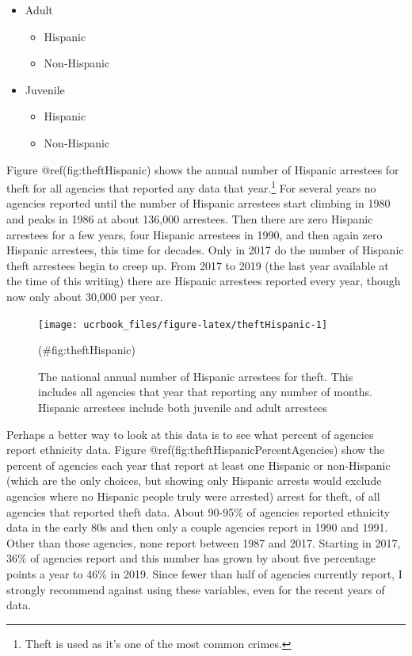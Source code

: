 \documentclass[
  12pt,
  openany]{book}
\providecommand{\tightlist}{%
  \setlength{\itemsep}{0pt}\setlength{\parskip}{0pt}}
\begin{document}
\begin{itemize}
\tightlist
\item
  Adult

  \begin{itemize}
  \tightlist
  \item
    Hispanic
  \item
    Non-Hispanic
  \end{itemize}
\item
  Juvenile

  \begin{itemize}
  \tightlist
  \item
    Hispanic
  \item
    Non-Hispanic
  \end{itemize}
\end{itemize}

Figure @ref(fig:theftHispanic) shows the annual number of Hispanic arrestees for theft for all agencies that reported any data that year.\footnote{Theft is used as it's one of the most common crimes.} For several years no agencies reported until the number of Hispanic arrestees start climbing in 1980 and peaks in 1986 at about 136,000 arrestees. Then there are zero Hispanic arrestees for a few years, four Hispanic arrestees in 1990, and then again zero Hispanic arrestees, this time for decades. Only in 2017 do the number of Hispanic theft arrestees begin to creep up. From 2017 to 2019 (the last year available at the time of this writing) there are Hispanic arrestees reported every year, though now only about 30,000 per year.

\begin{figure}

{\centering \texttt{[image: ucrbook\_files/figure-latex/theftHispanic-1]} 

}

\caption{The national annual number of Hispanic arrestees for theft. This includes all agencies that year that reporting any number of months. Hispanic arrestees include both juvenile and adult arrestees}(\#fig:theftHispanic)
\end{figure}

Perhaps a better way to look at this data is to see what percent of agencies report ethnicity data. Figure @ref(fig:theftHispanicPercentAgencies) show the percent of agencies each year that report at least one Hispanic or non-Hispanic (which are the only choices, but showing only Hispanic arrests would exclude agencies where no Hispanic people truly were arrested) arrest for theft, of all agencies that reported theft data. About 90-95\% of agencies reported ethnicity data in the early 80s and then only a couple agencies report in 1990 and 1991. Other than those agencies, none report between 1987 and 2017. Starting in 2017, 36\% of agencies report and this number has grown by about five percentage points a year to 46\% in 2019. Since fewer than half of agencies currently report, I strongly recommend against using these variables, even for the recent years of data.
\end{document}
